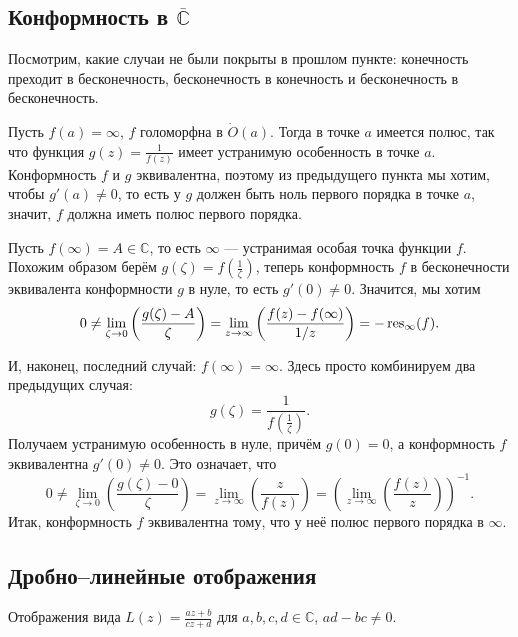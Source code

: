 \QED

\subsection{Конформность в $\overline{\mathbb C}$}
Посмотрим, какие случаи не были покрыты в прошлом пункте: конечность преходит в бесконечность, бесконечность в конечность и бесконечность в бесконечность.

Пусть $f(a) = \infty$, $f$ голоморфна в $\dot O(a)$.
Тогда в точке $a$ имеется полюс, так что функция $g(z) = \frac{1}{f(z)}$ имеет устранимую особенность в точке $a$.
Конформность $f$ и $g$ эквивалентна, поэтому из предыдущего пункта мы хотим, чтобы $g'(a) \ne 0$, то есть у $g$ должен быть ноль первого порядка в точке $a$, значит, $f$ должна иметь полюс первого порядка.

Пусть $f(\infty) = A \in \mathbb C$, то есть $\infty$ --- устранимая особая точка функции $f$.
Похожим образом берём $g(\zeta) = f(\frac{1}{\zeta})$, теперь конформность $f$ в бесконечности эквивалента конформности $g$ в нуле, то есть $g'(0) \ne 0$.
Значится, мы хотим
\[
    0 \ne \lim_{\zeta \to 0} \left( \frac{g(\zeta) - A}{\zeta} \right) = \lim_{z \to \infty} \left( \frac{f(z) - f(\infty)}{1/z} \right) = -\operatorname{res}_\infty(f).
\]

И, наконец, последний случай: $f(\infty) = \infty$.
Здесь просто комбинируем два предыдущих случая:
\[
    g(\zeta) = \frac{1}{f(\frac{1}{\zeta})}.
\]
Получаем устранимую особенность в нуле, причём $g(0) = 0$, а конформность $f$ эквивалентна $g'(0) \ne 0$.
Это означает, что
\[
    0 \ne \lim_{\zeta \to 0} \left( \frac{g(\zeta) - 0}{\zeta} \right) = \lim_{z \to \infty} \left( \frac{z}{f(z)} \right) = \left( \lim_{z \to \infty} \left( \frac{f(z)}{z} \right) \right)^{-1}.
\]
Итак, конформность $f$ эквивалентна тому, что у неё полюс первого порядка в $\infty$.

\subsection{Дробно--линейные отображения}
Отображения вида $L(z) = \frac{az + b}{cz + d}$ для $a, b, c, d \in \mathbb C$, $ad - bc \ne 0$.

